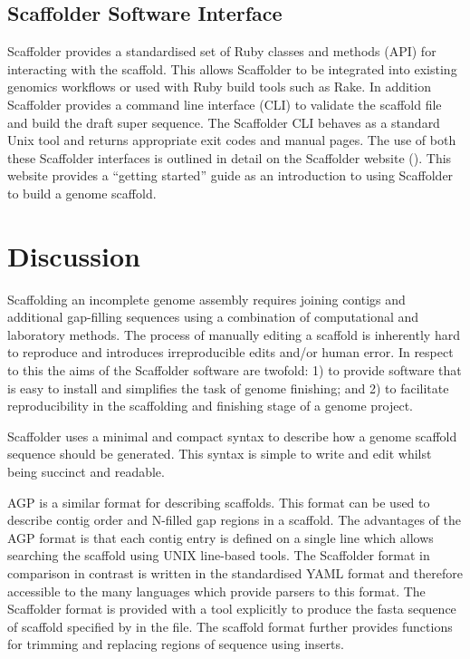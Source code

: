 \documentclass[10pt]{bmc_article}
\newenvironment{bmcformat}{\begin{raggedright}\baselineskip20pt\sloppy\setboolean{publ}{false}}{\end{raggedright}\baselineskip20pt\sloppy}
\begin{document}
\begin{bmcformat}
\subsection*{Scaffolder Software Interface} %

Scaffolder provides a standardised set of Ruby classes and methods (API) for
interacting with the scaffold. This allows Scaffolder to be integrated into
existing genomics workflows or used with Ruby build tools such as Rake. In
addition Scaffolder provides a command line interface (CLI) to validate the
scaffold file and build the draft super sequence. The Scaffolder CLI behaves as
a standard Unix tool and returns appropriate exit codes and manual pages. The
use of both these Scaffolder interfaces is outlined in detail on the Scaffolder
website (\scaffolder). This website provides a ``getting started'' guide as an
introduction to using Scaffolder to build a genome scaffold. \pb

\clearpage

\section*{Discussion} %

Scaffolding an incomplete genome assembly requires joining contigs and
additional gap-filling sequences using a combination of computational and
laboratory methods. The process of manually editing a scaffold is inherently
hard to reproduce and introduces irreproducible edits and/or human error. In
respect to this the aims of the Scaffolder software are twofold: 1) to provide
software that is easy to install and simplifies the task of genome finishing;
and 2) to facilitate reproducibility in the scaffolding and finishing stage of
a genome project. \pb

Scaffolder uses a minimal and compact syntax to describe how a genome scaffold
sequence should be generated. This syntax is simple to write and edit whilst
being succinct and readable. 

AGP is a similar format for describing scaffolds. This format can be used to
describe contig order and N-filled gap regions in a scaffold. The advantages of
the AGP format is that each contig entry is defined on a single line which
allows searching the scaffold using UNIX line-based tools. The Scaffolder
format in comparison in contrast is written in the standardised YAML format and
therefore accessible to the many languages which provide parsers to this
format. The Scaffolder format is provided with a tool explicitly to produce the
fasta sequence of scaffold specified by in the file. The scaffold format
further provides functions for trimming and replacing regions of sequence using
inserts. \pb


\end{bmcformat}
\end{document}

